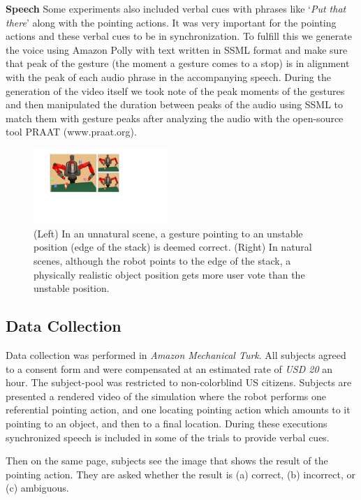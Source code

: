 \documentclass[letterpaper]{article} %
\begin{document}
\noindent\textbf{Speech} Some experiments also included verbal cues with phrases like `\textit{Put that there}' along with the pointing actions. It was very important for the pointing actions and these verbal cues to be in synchronization. To fulfill this we generate the voice using Amazon Polly with text written in SSML format and make sure that peak of the gesture (the moment a gesture comes to a stop) is in alignment with the peak of each audio phrase in the accompanying speech. During the generation of the video itself we took note of the peak moments of the gestures and then manipulated the duration between peaks of the audio using SSML to match them with gesture peaks after analyzing the audio with the open-source tool PRAAT (www.praat.org).



\begin{figure}[t]
    \centering
    \includegraphics[width=0.45\textwidth]{natural.pdf}
    \caption{(Left) In an unnatural scene, a gesture pointing to an unstable position (edge of the stack) is deemed correct. (Right) In natural scenes, although the robot points to the edge of the stack, a physically realistic object position gets more user vote than the unstable position.}
    \label{fig:natural}
\end{figure}

\subsection{Data Collection}

Data collection was performed in \textit{Amazon Mechanical Turk}. All subjects agreed to a consent form and were compensated at an estimated rate of \textit{USD 20} an hour. The subject-pool was restricted to non-colorblind US citizens. Subjects are presented a rendered video of the simulation where the robot performs one referential pointing action, and one locating pointing action which amounts to it pointing to an object, and then to a final location. During these executions synchronized speech is included in some of the trials to provide verbal cues.

Then on the same page, subjects see the image that shows the result of the pointing action. They are asked whether the result is (a) correct, (b) incorrect, or (c) ambiguous.  
\end{document}
